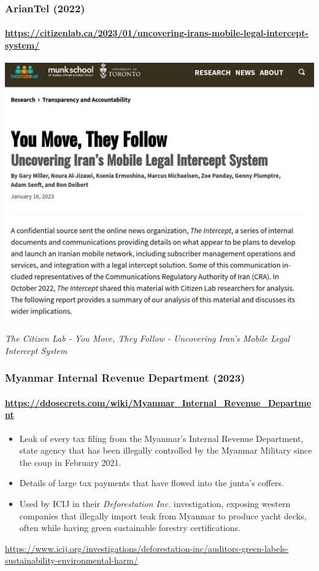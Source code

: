 \documentclass[aspectratio=169,usenames,dvipsnames]{beamer}
\begin{document}
\begin{frame}[c]
  \frametitle{ArianTel (2022)}
  \framesubtitle{\url{https://citizenlab.ca/2023/01/uncovering-irans-mobile-legal-intercept-system/}}

  \footnotesize \centering

  \includegraphics[width=\textwidth,height=0.6\textheight,keepaspectratio]{img/ariantel2.png}

  \vfill
  \emph{The Citizen Lab - You Move, They Follow - Uncovering Iran's Mobile
  Legal Intercept System}

\end{frame}

\begin{frame}[c]

  \LARGE

\end{frame}

\begin{frame}[c]
  \frametitle{Myanmar Internal Revenue Department (2023)}
  \framesubtitle{\url{https://ddosecrets.com/wiki/Myanmar_Internal_Revenue_Department}}

  \begin{itemize}[<+->]
    \item Leak of every tax filing from the Myanmar's Internal Revenue
      Department, state agency that has been illegally controlled by the
      Myanmar Military since the coup in February 2021.
    \item Details of large tax payments that have flowed into the junta's
      coffers.
    \item Used by ICIJ in their \emph{Deforestation Inc.} investigation,
      exposing western companies that illegally import teak from Myanmar to
      produce yacht decks, often while having green sustainable forestry
      certifications.
  \end{itemize}

  \vfill \footnotesize \centering \pause
  \url{https://www.icij.org/investigations/deforestation-inc/auditors-green-labels-sustainability-environmental-harm/}
\end{frame}
\end{document}
